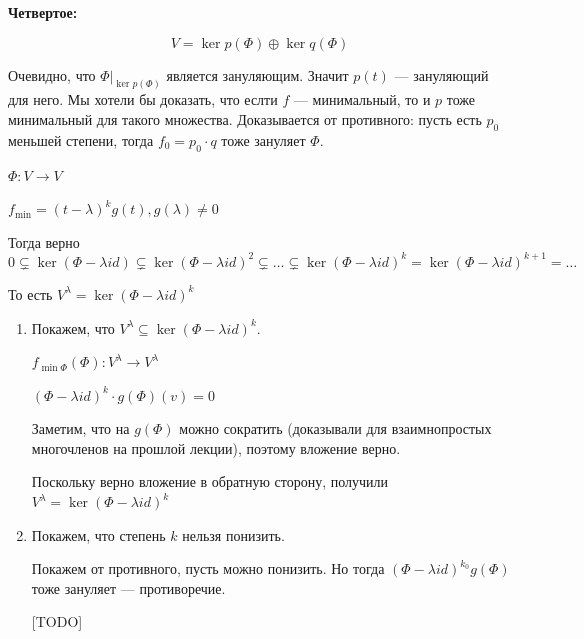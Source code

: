 \textbf{Четвертое:}

\[
    V = \ker p(\Phi) \oplus \ker q(\Phi)
\]

Очевидно, что \( \Phi |_{\ker p(\Phi)} \) является зануляющим.
Значит \( p(t) \) --- зануляющий для него.
Мы хотели бы доказать, что еслти \( f \) --- минимальный, то и \( p \) тоже минимальный для такого множества.
Доказывается от противного:
пусть есть \( p_0 \) меньшей степени, тогда \( f_0 = p_0 \cdot q \) тоже зануляет \( \Phi \).

\begin{lemma}{}{}
    \( \Phi : V \to V \)

    \( f_{\min} = (t - \lambda)^k g(t), g(\lambda) \neq 0  \)

    Тогда верно
    \[
        0
        \subsetneq
        \ker (\Phi - \lambda id)
        \subsetneq
        \ker (\Phi - \lambda id)^2
        \subsetneq
        \ldots
        \subsetneq
        \ker (\Phi - \lambda id)^k
        =
        \ker (\Phi - \lambda id)^{k + 1}
        =
        \ldots
    \]
\end{lemma}

\begin{remark}{}{}
    То есть \( V^{\lambda} = \ker (\Phi - \lambda id)^k \)
\end{remark}

\begin{enumerate}
    \item
        Покажем, что \( V^{\lambda} \subseteq \ker (\Phi - \lambda id)^k \).

        \( f_{\min \Phi} (\Phi) : V^\lambda \to V^\lambda \)

        \( (\Phi - \lambda id)^k \cdot g(\Phi) (v) = 0 \)

        Заметим, что на \( g(\Phi) \) можно сократить (доказывали для взаимнопростых многочленов на прошлой лекции),
        поэтому вложение верно.

        Поскольку верно вложение в обратную сторону, получили \( V^{\lambda} = \ker (\Phi - \lambda id)^k \)
    \item
        Покажем, что степень \( k \) нельзя понизить.

        Покажем от противного, пусть можно понизить.
        Но тогда \( (\Phi - \lambda id)^{k_0} g(\Phi) \) тоже зануляет --- противоречие.

        [TODO]
\end{enumerate}

\newpage

